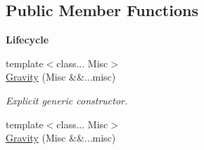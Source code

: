 \subsection*{Public Member Functions}
\begin{Indent}{\bf Lifecycle}\par
\begin{DoxyCompactItemize}
\item 
{\footnotesize template$<$class... Misc$>$ }\\\hyperlink{exceptionGravity_a7aafa23bc3ab24b4f034a2cfa522410c}{Gravity} (Misc \&\&...misc)
\begin{DoxyCompactList}\small\item\em Explicit generic constructor. \end{DoxyCompactList}\item 
{\footnotesize template$<$class... Misc$>$ }\\\hyperlink{exceptionGravity_a7aafa23bc3ab24b4f034a2cfa522410c}{Gravity} (Misc \&\&...misc)
\end{DoxyCompactItemize}
\end{Indent}

